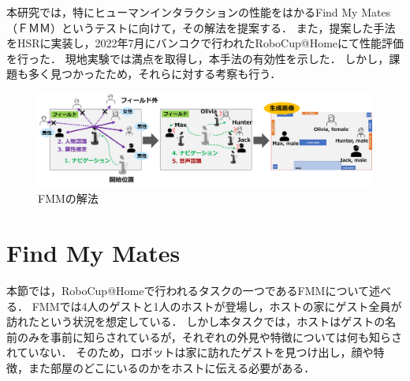 \documentclass[a4j]{jarticle}
\begin{document}
本研究では，特にヒューマンインタラクションの性能をはかるFind My Mates（ＦＭＭ）というテストに向けて，その解法を提案する．
また，提案した手法をHSRに実装し，2022年7月にバンコクで行われたRoboCup@Homeにて性能評価を行った．
現地実験では満点を取得し，本手法の有効性を示した．
しかし，課題も多く見つかったため，それらに対する考察も行う．

\begin{figure}[ht]
  \centering
  \includegraphics[width=16cm]{images/FMM/solution_overview_yoko_yy2.png}
  \caption{FMMの解法}
  \label{solution_overview}
\end{figure}



\section{Find My Mates}
本節では，RoboCup@Homeで行われるタスクの一つであるFMMについて述べる．
FMMでは4人のゲストと1人のホストが登場し，ホストの家にゲスト全員が訪れたという状況を想定している．
しかし本タスクでは，ホストはゲストの名前のみを事前に知らされているが，それぞれの外見や特徴については何も知らされていない．
そのため，ロボットは家に訪れたゲストを見つけ出し，顔や特徴，また部屋のどこにいるのかをホストに伝える必要がある．
\end{document}
